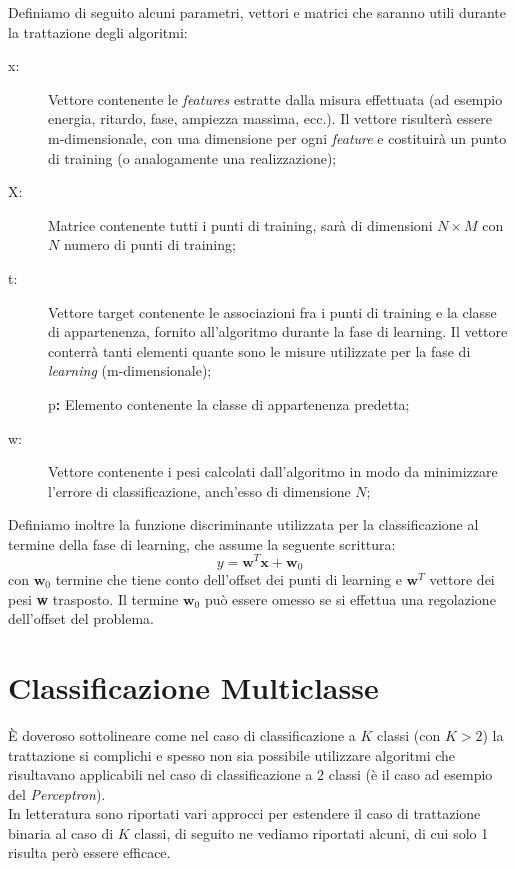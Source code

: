 Definiamo di seguito alcuni parametri, vettori e matrici che saranno utili durante la trattazione degli algoritmi:

\begin{description}
	\item[x:] Vettore contenente le \emph{features} estratte dalla misura effettuata (ad esempio energia, ritardo, fase, ampiezza massima, ecc.). Il vettore risulter\`{a} essere m-dimensionale, con una dimensione per ogni \emph{feature} e costituir\`{a} un punto di training (o analogamente una realizzazione);
	\item[X:] Matrice contenente tutti i punti di training, sar\`{a} di dimensioni $N\times M$ con $N$ numero di punti di training; 
	\item[t:] Vettore target contenente le associazioni fra i punti di training e la classe di appartenenza, fornito all'algoritmo durante la fase di learning. Il vettore conterr\`{a} tanti elementi quante sono le misure utilizzate per la fase di \emph{learning} (m-dimensionale);
	\item[]p\textbf{:} Elemento contenente la classe di appartenenza predetta;
	\item[w:] Vettore contenente i pesi calcolati dall'algoritmo in modo da minimizzare l'errore di classificazione, anch'esso di dimensione $N$;
\end{description}

Definiamo inoltre la funzione discriminante utilizzata per la classificazione al termine della fase di learning, che assume la seguente scrittura: 
\begin{equation}
y = \mathbf{w}^T \mathbf{x} + \mathbf{w}_0
\end{equation}
con $\mathbf{w}_0$ termine che tiene conto dell'offset dei punti di learning e $\mathbf{w}^T$ vettore dei pesi \textbf{w} trasposto. Il termine $\mathbf{w}_0$ pu\`{o} essere omesso se si effettua una regolazione dell'offset del problema.


\newpage
\section{Classificazione Multiclasse}
\`{E} doveroso sottolineare come nel caso di classificazione a $K$ classi (con $K>2$) la trattazione si complichi e spesso non sia possibile utilizzare algoritmi che risultavano applicabili nel caso di classificazione a 2 classi (\`{e} il caso ad esempio del \emph{Perceptron}).\\
In letteratura \cite{Bishop} sono riportati vari approcci per estendere il caso di trattazione binaria al caso di $K$ classi, di seguito ne vediamo riportati alcuni, di cui solo 1 risulta per\`{o} essere efficace.

